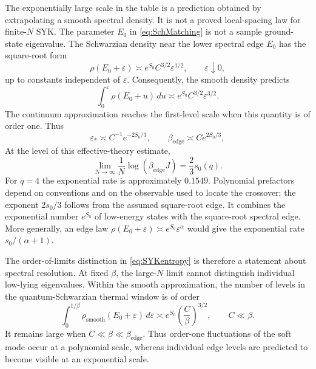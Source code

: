 \documentclass[11pt]{article}
\numberwithin{equation}{section}
\theoremstyle{exposition}
\theoremstyle{result}
\begin{document}
The exponentially large scale in the table is a prediction obtained by extrapolating a smooth spectral density. It is not a proved local-spacing law for finite-$N$ SYK. The parameter $E_0$ in \eqref{eq:SchMatching} is not a sample ground-state eigenvalue.  The Schwarzian density near the lower spectral edge $E_0$ has the square-root form
\begin{equation}
\rho(E_0+\varepsilon)
\asymp e^{S_0}C^{3/2}\varepsilon^{1/2},
\qquad \varepsilon\downarrow0,
\label{eq:introSchEdge}
\end{equation}
up to constants independent of $\varepsilon$.  Consequently, the smooth density predicts
\begin{equation*}
\int_0^\varepsilon\rho(E_0+u)\,du
\asymp e^{S_0}C^{3/2}\varepsilon^{3/2}.
\end{equation*}
The continuum approximation reaches the first-level scale when this quantity is of order one.  Thus
\begin{equation}
\varepsilon_*
\asymp C^{-1}e^{-2S_0/3},
\qquad
\beta_{\mathrm{edge}}
\asymp C e^{2S_0/3},
\label{eq:introEdgeScale}
\end{equation}
At the level of this effective-theory estimate,
\begin{equation}
\lim_{N\to\infty}\frac1N
\log(\beta_{\mathrm{edge}}J)=\frac23s_0(q).
\label{eq:introEdgeRate}
\end{equation}
For $q=4$ the exponential rate is approximately $0.1549$.  Polynomial prefactors depend on conventions and on the observable used to locate the crossover; the exponent $2s_0/3$ follows from the assumed square-root edge.  It combines the exponential number $e^{S_0}$ of low-energy states with the square-root spectral edge.  More generally, an edge law $\rho(E_0+\varepsilon)\asymp e^{S_0}\varepsilon^\alpha$ would give the exponential rate $s_0/(\alpha+1)$.

The order-of-limits distinction in \eqref{eq:SYKentropy} is therefore a statement about spectral resolution. At fixed $\beta$, the large-$N$ limit cannot distinguish individual low-lying eigenvalues. Within the smooth approximation, the number of levels in the quantum-Schwarzian thermal window is of order
\begin{equation*}
\int_0^{1/\beta}\rho_{\mathrm{smooth}}(E_0+\varepsilon)\,d\varepsilon
\asymp e^{S_0}\left(\frac C\beta\right)^{3/2},
\qquad C\ll\beta.
\end{equation*}
It remains large when $C\ll\beta\ll\beta_{\mathrm{edge}}$. Thus order-one fluctuations of the soft mode occur at a polynomial scale, whereas individual edge levels are predicted to become visible at an exponential scale.
\end{document}
